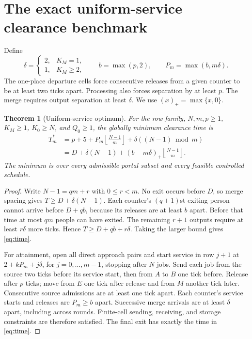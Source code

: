 \documentclass[11pt]{article}
\newtheorem{theorem}{Theorem}
\newcommand{\pos}[1]{\left(#1\right)_{+}}
\newcommand{\floor}[1]{\left\lfloor#1\right\rfloor}
\begin{document}
\section{The exact uniform-service clearance benchmark}
Define
\[
 \delta=\begin{cases}2,&K_M=1,\\1,&K_M\ge2,\end{cases}
 \qquad b=\max(p,2),\qquad P_m=\max(b,m\delta).
\]
The one-place departure cells force consecutive releases from a given counter to be at least two ticks apart. Processing also forces separation by at least $p$. The merge requires output separation at least $\delta$. We use $(x)_+=\max\{x,0\}$.

\begin{theorem}[Uniform-service optimum]
For the row family, $N,m,p\ge1$, $K_M\ge1$, $K_0\ge N$, and $Q_0\ge1$, the globally minimum clearance time is
\begin{align}
 T_m^*&=p+5+P_m\floor{\frac{N-1}{m}}+\delta((N-1)\bmod m)\label{eq:time}\\
 &=D+\delta(N-1)+\pos{b-m\delta}\floor{\frac{N-1}{m}}.\nonumber
\end{align}
The minimum is over every admissible portal subset and every feasible controlled schedule.
\end{theorem}
\begin{proof}
Write $N-1=qm+r$ with $0\le r<m$. No exit occurs before $D$, so merge spacing gives $T\ge D+\delta(N-1)$. Each counter's $(q+1)$st exiting person cannot arrive before $D+qb$, because its releases are at least $b$ apart. Before that time at most $qm$ people can have exited. The remaining $r+1$ outputs require at least $r\delta$ more ticks. Hence $T\ge D+qb+r\delta$. Taking the larger bound gives \eqref{eq:time}.

For attainment, open all direct approach pairs and start service in row $j+1$ at $2+kP_m+j\delta$, for $j=0,\ldots,m-1$, stopping after $N$ jobs. Send each job from the source two ticks before its service start, then from $A$ to $B$ one tick before. Release after $p$ ticks; move from $E$ one tick after release and from $M$ another tick later. Consecutive source admissions are at least one tick apart. Each counter's service starts and releases are $P_m\ge b$ apart. Successive merge arrivals are at least $\delta$ apart, including across rounds. Finite-cell sending, receiving, and storage constraints are therefore satisfied. The final exit has exactly the time in \eqref{eq:time}.
\end{proof}
\end{document}
